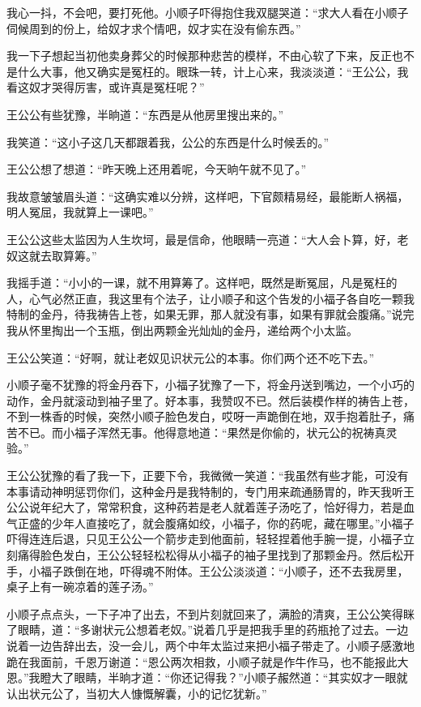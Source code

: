 我心一抖，不会吧，要打死他。小顺子吓得抱住我双腿哭道：“求大人看在小顺子伺候周到的份上，给奴才求个情吧，奴才实在没有偷东西。”

我一下子想起当初他卖身葬父的时候那种悲苦的模样，不由心软了下来，反正也不是什么大事，他又确实是冤枉的。眼珠一转，计上心来，我淡淡道：“王公公，我看这奴才哭得厉害，或许真是冤枉呢？”

王公公有些犹豫，半晌道：“东西是从他房里搜出来的。”

我笑道：“这小子这几天都跟着我，公公的东西是什么时候丢的。”

王公公想了想道：“昨天晚上还用着呢，今天晌午就不见了。”

我故意皱皱眉头道：“这确实难以分辨，这样吧，下官颇精易经，最能断人祸福，明人冤屈，我就算上一课吧。”

王公公这些太监因为人生坎坷，最是信命，他眼睛一亮道：“大人会卜算，好，老奴这就去取算筹。”

我摇手道：“小小的一课，就不用算筹了。这样吧，既然是断冤屈，凡是冤枉的人，心气必然正直，我这里有个法子，让小顺子和这个告发的小福子各自吃一颗我特制的金丹，待我祷告上苍，如果无罪，那人就没有事，如果有罪就会腹痛。”说完我从怀里掏出一个玉瓶，倒出两颗金光灿灿的金丹，递给两个小太监。

王公公笑道：“好啊，就让老奴见识状元公的本事。你们两个还不吃下去。”

小顺子毫不犹豫的将金丹吞下，小福子犹豫了一下，将金丹送到嘴边，一个小巧的动作，金丹就滚动到袖子里了。好本事，我赞叹不已。然后装模作样的祷告上苍，不到一株香的时候，突然小顺子脸色发白，哎呀一声跪倒在地，双手抱着肚子，痛苦不已。而小福子浑然无事。他得意地道：“果然是你偷的，状元公的祝祷真灵验。”

王公公犹豫的看了我一下，正要下令，我微微一笑道：“我虽然有些才能，可没有本事请动神明惩罚你们，这种金丹是我特制的，专门用来疏通肠胃的，昨天我听王公公说年纪大了，常常积食，这种药若是老人就着莲子汤吃了，恰好得力，若是血气正盛的少年人直接吃了，就会腹痛如绞，小福子，你的药呢，藏在哪里。”小福子吓得连连后退，只见王公公一个箭步走到他面前，轻轻捏着他手腕一提，小福子立刻痛得脸色发白，王公公轻轻松松得从小福子的袖子里找到了那颗金丹。然后松开手，小福子跌倒在地，吓得魂不附体。王公公淡淡道：“小顺子，还不去我房里，桌子上有一碗凉着的莲子汤。”

小顺子点点头，一下子冲了出去，不到片刻就回来了，满脸的清爽，王公公笑得眯了眼睛，道：“多谢状元公想着老奴。”说着几乎是把我手里的药瓶抢了过去。一边说着一边告辞出去，没一会儿，两个中年太监过来把小福子带走了。小顺子感激地跪在我面前，千恩万谢道：“恩公两次相救，小顺子就是作牛作马，也不能报此大恩。”我瞪大了眼睛，半晌才道：“你还记得我？”小顺子赧然道：“其实奴才一眼就认出状元公了，当初大人慷慨解囊，小的记忆犹新。”


